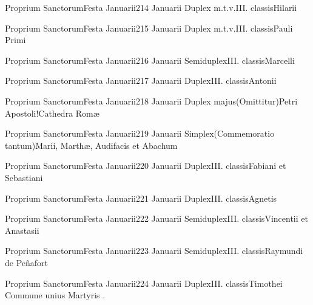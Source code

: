 \documentclass[nocturnale-romanum.tex]{subfiles}
\begin{document}


	{Proprium Sanctorum}{Festa Januarii}{2}{14 Januarii}
	{Duplex m.t.v.}{III. classis}{Hilarii}
	{}
	{}
	
	{Proprium Sanctorum}{Festa Januarii}{2}{15 Januarii}
	{Duplex m.t.v.}{III. classis}{Pauli Primi}
	{}
	{}

	{Proprium Sanctorum}{Festa Januarii}{2}{16 Januarii}
	{Semiduplex}{III. classis}{Marcelli}
	{}
	{}
	
	{Proprium Sanctorum}{Festa Januarii}{2}{17 Januarii}
	{Duplex}{III. classis}{Antonii}
	{}
	{}

	{Proprium Sanctorum}{Festa Januarii}{2}{18 Januarii}
	{Duplex majus}{(Omittitur)}{Petri Apostoli!Cathedra Romæ}
	{}
	{}

	{Proprium Sanctorum}{Festa Januarii}{2}{19 Januarii}
	{Simplex}{(Commemoratio tantum)}{Marii, Marthæ, Audifacis et Abachum}
	{}
	{}

	{Proprium Sanctorum}{Festa Januarii}{2}{20 Januarii}
	{Duplex}{III. classis}{Fabiani et Sebastiani}
	{}
	{}

	{Proprium Sanctorum}{Festa Januarii}{2}{21 Januarii}
	{Duplex}{III. classis}{Agnetis}
	{}
	{}

	{Proprium Sanctorum}{Festa Januarii}{2}{22 Januarii}
	{Semiduplex}{III. classis}{Vincentii et Anastasii}
	{}
	{}

	{Proprium Sanctorum}{Festa Januarii}{2}{23 Januarii}
	{Semiduplex}{III. classis}{Raymundi de Peñafort}
	{}
	{}

	{Proprium Sanctorum}{Festa Januarii}{2}{24 Januarii}
	{Duplex}{III. classis}{Timothei}
	{Commune unius Martyris \pageref{M-UMEX}.}
	{}
\end{document}
